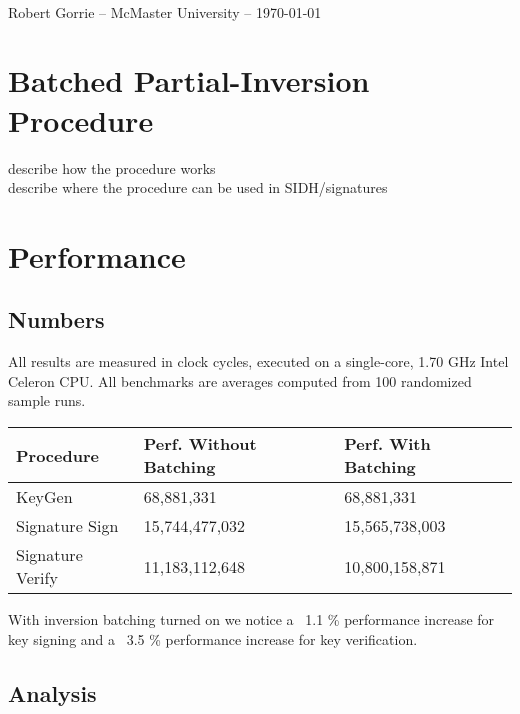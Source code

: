 \documentclass[10pt]{article}
\begin{document}
\begin{center}
\large {}\\
\normalsize {Robert Gorrie -- McMaster University -- \today}\\
\end{center}
\hline
{}


\section{Batched Partial-Inversion Procedure}

describe how the procedure works\\
describe where the procedure can be used in SIDH/signatures\\

\section{Performance}

\subsection{Numbers}

All results are measured in clock cycles, executed on a single-core, 1.70 GHz Intel Celeron CPU. All benchmarks are averages computed from 100 randomized sample runs.

\begin{center}
\begin{tabular}{@{}lll@{}}
	\toprule
	Procedure & Perf. Without Batching & Perf. With Batching \\
	\midrule
	KeyGen & 68,881,331 & 68,881,331\\
	Signature Sign & 15,744,477,032 & 15,565,738,003\\
	Signature Verify & 11,183,112,648 & 10,800,158,871\\
	\bottomrule
\end{tabular}
\end{center}

With inversion batching turned on we notice a ~1.1 \% performance increase for key signing and a ~3.5 \% performance increase for key verification.



\subsection{Analysis}
\end{document}
